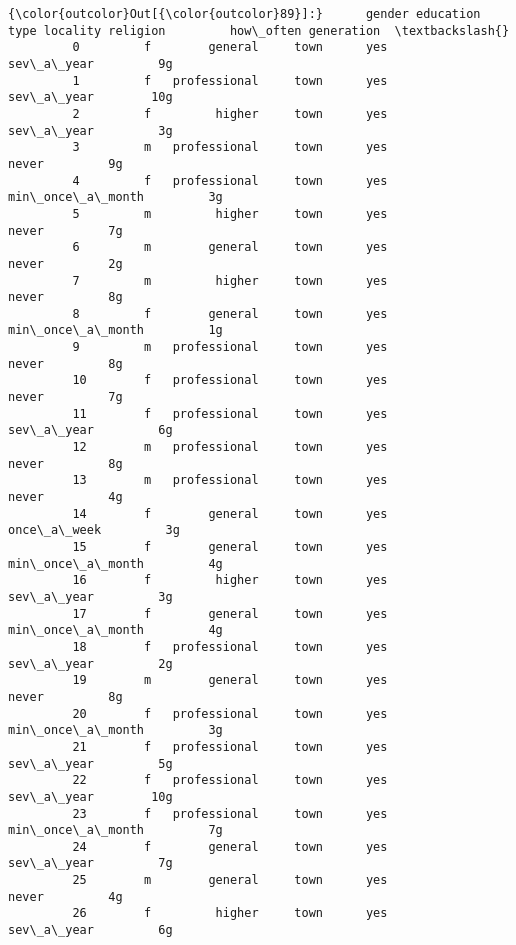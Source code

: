 \documentclass[11pt]{article}
\begin{document}
\begin{Verbatim}[commandchars=\\\{\}]
{\color{outcolor}Out[{\color{outcolor}89}]:}      gender education type locality religion         how\_often generation  \textbackslash{}
         0         f        general     town      yes        sev\_a\_year         9g   
         1         f   professional     town      yes        sev\_a\_year        10g   
         2         f         higher     town      yes        sev\_a\_year         3g   
         3         m   professional     town      yes             never         9g   
         4         f   professional     town      yes  min\_once\_a\_month         3g   
         5         m         higher     town      yes             never         7g   
         6         m        general     town      yes             never         2g   
         7         m         higher     town      yes             never         8g   
         8         f        general     town      yes  min\_once\_a\_month         1g   
         9         m   professional     town      yes             never         8g   
         10        f   professional     town      yes             never         7g   
         11        f   professional     town      yes        sev\_a\_year         6g   
         12        m   professional     town      yes             never         8g   
         13        m   professional     town      yes             never         4g   
         14        f        general     town      yes       once\_a\_week         3g   
         15        f        general     town      yes  min\_once\_a\_month         4g   
         16        f         higher     town      yes        sev\_a\_year         3g   
         17        f        general     town      yes  min\_once\_a\_month         4g   
         18        f   professional     town      yes        sev\_a\_year         2g   
         19        m        general     town      yes             never         8g   
         20        f   professional     town      yes  min\_once\_a\_month         3g   
         21        f   professional     town      yes        sev\_a\_year         5g   
         22        f   professional     town      yes        sev\_a\_year        10g   
         23        f   professional     town      yes  min\_once\_a\_month         7g   
         24        f        general     town      yes        sev\_a\_year         7g   
         25        m        general     town      yes             never         4g   
         26        f         higher     town      yes        sev\_a\_year         6g   

\end{Verbatim}
\end{document}
